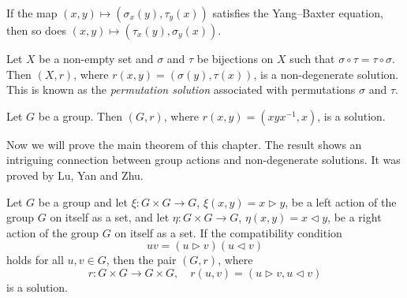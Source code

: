 \begin{example}
If the map $(x,y)\mapsto(\sigma_x(y),\tau_y(x))$ satisfies the Yang--Baxter equation, then 
so does $(x,y)\mapsto (\tau_x(y),\sigma_y(x))$. 
\end{example}

\begin{example}
\label{exa:Lyubashenko}
Let $X$ be a non-empty set and $\sigma$ and $\tau$ be 
bijections on $X$ such that $\sigma\circ\tau=\tau\circ\sigma$. Then 
$(X,r)$, where $r(x,y)=(\sigma(y),\tau(x))$, is a non-degenerate solution. 
This is known as the \emph{permutation solution} associated
with permutations $\sigma$ and $\tau$. 
\end{example}
%

\begin{example}
\label{exa:Venkov}
Let $G$ be a group. Then $(G,r)$, where $r(x,y)=(xyx^{-1},x)$, is a solution. 
\end{example}

Now we will prove the main theorem of this chapter. The result
shows an intriguing connection 
between group actions and non-degenerate solutions. It 
was proved by Lu, Yan and Zhu. 

\begin{theorem}
\label{thm:LYZ}
Let $G$ be a group and let $\xi\colon G\times G\to G$, $\xi(x,y)=x\rhd y$,
be a left action of the group $G$ on itself as a set, and 
let $\eta\colon G\times G\to G$, $\eta(x,y)=x\lhd y$, 
be a right action of the group $G$ on itself as a set. If the compatibility condition
\[
uv=(u\rhd v)(u\lhd v)
\]
holds for all $u,v\in G$, then the pair $(G,r)$, where 
\[
r\colon G\times G\to G\times G,\quad
r(u,v)=(u\rhd v,u\lhd v)
\]
is a solution. 
\end{theorem}

